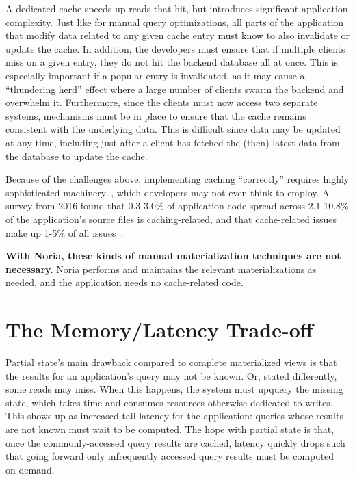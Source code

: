 A dedicated cache speeds up reads that hit, but introduces significant
application complexity. Just like for manual query optimizations, all parts of
the application that modify data related to any given cache entry must know to
also invalidate or update the cache. In addition, the developers must ensure
that if multiple clients miss on a given entry, they do not hit the backend
database all at once. This is especially important if a popular entry is
invalidated, as it may cause a ``thundering herd'' effect where a large number
of clients swarm the backend and overwhelm it. Furthermore, since the clients
must now access two separate systems, mechanisms must be in place to ensure that
the cache remains consistent with the underlying data. This is difficult since
data may be updated at any time, including just after a client has fetched the
(then) latest data from the database to update the cache.

Because of the challenges above, implementing caching ``correctly'' requires
highly sophisticated machinery~\cite{facebook-memcache, transactional-cache,
orm-cache, sql-cache}, which developers may not even think to employ. A survey
from 2016 found that 0.3-3.0\% of application code spread across 2.1-10.8\% of
the application's source files is caching-related, and that cache-related issues
make up 1-5\% of all issues~\cite{caching-is-hard}.

\textbf{With Noria, these kinds of manual materialization techniques are not
necessary.} Noria performs and maintains the relevant materializations as
needed, and the application needs no cache-related code.

\section{The Memory/Latency Trade-off}
\label{s:eval:cost}

Partial state's main drawback compared to complete materialized views is
that the results for an application's query may not be known. Or, stated
differently, some reads may miss. When this happens, the system must upquery the
missing state, which takes time and consumes resources otherwise dedicated to
writes. This shows up as increased tail latency for the application: queries
whose results are not known must wait to be computed. The hope with partial
state is that, once the commonly-accessed query results are cached, latency
quickly drops such that going forward only infrequently accessed query results
must be computed on-demand.

